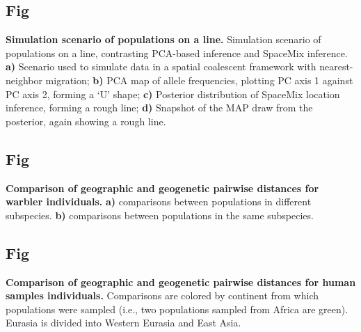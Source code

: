 \documentclass[10pt,letterpaper]{article}
\begin{document}
\subsection{Fig}
\label{sfig:line_scenario}
{\bf{
Simulation scenario of populations on a line.}}
Simulation scenario of populations on a line, contrasting PCA-based inference and SpaceMix inference. 
	\textbf{a)} 
		Scenario used to simulate data in a spatial coalescent framework 
		with nearest-neighbor migration;
	\textbf{b)} 
		PCA map of allele frequencies, plotting PC axis 1 against PC axis 2, forming a `U' shape; 
	\textbf{c)}
		Posterior distribution of SpaceMix location inference, forming a rough line; 
	\textbf{d)}
		Snapshot of the MAP draw from the posterior, again showing a rough line.

\subsection{Fig}
\label{sfig:warb_ind_distcomp}
{\bf{
Comparison of geographic and geogenetic pairwise distances for warbler individuals.}} 
\textbf{a)} comparisons between populations in different subspecies.
\textbf{b)} comparisons between populations in the same subspecies.

\subsection{Fig}
\label{sfig:globe_noad_distcomp}
{\bf{
Comparison of geographic and geogenetic pairwise distances for human samples individuals.}} 
Comparisons are colored by continent from which populations were sampled 
(i.e., two populations sampled from Africa are green).
Eurasia is divided into Western Eurasia and East Asia.
\end{document}
